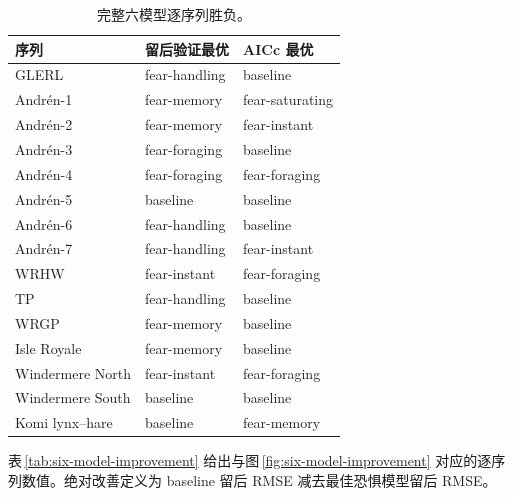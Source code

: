 \documentclass[12pt,a4paper]{ctexart}
\begin{document}
\begin{table}[H]
 \centering
 \caption{完整六模型逐序列胜负。}
 \label{tab:six-model-winners}
 \small
 \begin{tabular}{lll}
  \toprule
  序列 & 留后验证最优 & AICc 最优\\
  \midrule
  GLERL & fear-handling & baseline\\
  Andrén-1 & fear-memory & fear-saturating\\
 Andrén-2 & fear-memory & fear-instant\\
 Andrén-3 & fear-foraging & baseline\\
 Andrén-4 & fear-foraging & fear-foraging\\
 Andrén-5 & baseline & baseline\\
 Andrén-6 & fear-handling & baseline\\
 Andrén-7 & fear-handling & fear-instant\\
  WRHW & fear-instant & fear-foraging\\
  TP & fear-handling & baseline\\
 WRGP & fear-memory & baseline\\
 Isle Royale & fear-memory & baseline\\
  Windermere North & fear-instant & fear-foraging\\
  Windermere South & baseline & baseline\\
  Komi lynx--hare & baseline & fear-memory\\
  \bottomrule
 \end{tabular}
\end{table}

表\,\ref{tab:six-model-improvement} 给出与图\,\ref{fig:six-model-improvement} 对应的逐序列数值。绝对改善定义为 baseline 留后 RMSE 减去最佳恐惧模型留后 RMSE。
\end{document}
